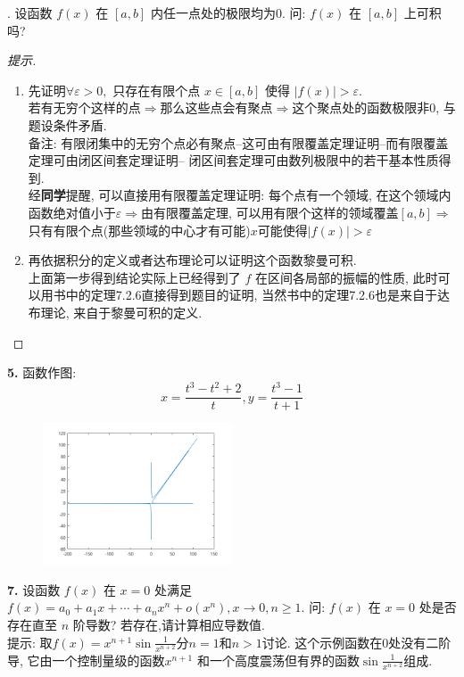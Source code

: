 \documentclass[a4paper,12pt]{article}
\theoremstyle{nonumberplain}
\begin{document}
. 设函数 $f(x)$ 在 $[a,b]$ 内任一点处的极限均为0. 问: $f(x)$ 在 $[a,b]$ 上可积吗?\\
\begin{proof}[提示]
\begin{enumerate}
  \item 先证明$\forall \varepsilon>0,$ 只存在有限个点 $x\in[a,b]$ 使得 $|f(x)|>\varepsilon$.\\
    若有无穷个这样的点$\Rightarrow$那么这些点会有聚点$\Rightarrow$这个聚点处的函数极限非0, 与题设条件矛盾.\\
    备注: 有限闭集中的无穷个点必有聚点--这可由有限覆盖定理证明--而有限覆盖定理可由闭区间套定理证明--
    闭区间套定理可由数列极限中的若干基本性质得到.\\
    经\textbf{同学}提醒, 可以直接用有限覆盖定理证明: 每个点有一个领域, 
    在这个领域内函数绝对值小于$\varepsilon\Rightarrow$由有限覆盖定理, 
    可以用有限个这样的领域覆盖$[a,b]$$\Rightarrow$
    只有有限个点(那些领域的中心才有可能)$x$可能使得$|f(x)|>\varepsilon$
  \item 再依据积分的定义或者达布理论可以证明这个函数黎曼可积. \\
    上面第一步得到结论实际上已经得到了 $f$ 在区间各局部的振幅的性质, 
    此时可以用书中的定理7.2.6直接得到题目的证明, 当然书中的定理7.2.6也是来自于达布理论, 
    来自于黎曼可积的定义.
\end{enumerate}
\end{proof}

\noindent \textbf{5.} 函数作图:
\[
x = \frac{t^3-t^2+2}{t}, 
y = \frac{t^3-1}{t+1}
\]
\begin{figure}[htbp]
  \centering
  \includegraphics[width = 0.5\textwidth]{20180228_5.png}
  \caption{}
  \label{}
\end{figure}

\noindent \textbf{7.} 设函数 $f(x)$ 在 $x=0$ 处满足 
$f(x)=a_0+a_1x+\cdots+a_nx^n+o(x^n),x\to 0,n\geq1$. 
问: $f(x)$ 在 $x=0$ 处是否存在直至 $n$ 阶导数? 若存在,请计算相应导数值.\\
提示: 取$f(x)=x^{n+1}\sin\frac{1}{x^{n+2}}$分$n=1$和$n>1$讨论.
这个示例函数在0处没有二阶导, 它由一个控制量级的函数$x^{n+1}$
和一个高度震荡但有界的函数$\sin\frac{1}{x^{n+2}}$组成.
\end{document}

